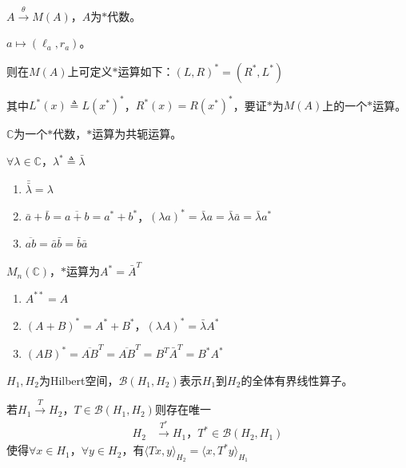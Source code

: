 \documentclass[lang=cn,a4paper,newtx,section]{elegantbook}
\begin{document}
\begin{proposition}
  $A \xrightarrow{\theta} M(A)$，$A$为$*$代数。
  
  $a \longmapsto (\ell_a, r_a)$。
  
  则在$M(A)$上可定义$*$运算如下：$(L, R)^* = (R^*, L^*)$
  
  其中$L^*(x) \triangleq L(x^*)^*$，$R^*(x) = R(x^*)^*$，要证$*$为$M(A)$上的一个$*$运算。
\end{proposition}

\begin{example}
  $\mathbb{C}$为一个$*$代数，$*$运算为共轭运算。
  
  $\forall \lambda \in \mathbb{C}$，$\lambda^* \triangleq \bar{\lambda}$
  
  \begin{enumerate}
    \item $\bar{\bar{\lambda}} = \lambda$
    \item $\bar{a} + \bar{b} = \overline{a + b}=a^*+b^*$，$(\lambda a)^* = \bar{\lambda}a = \bar{\lambda}\bar{a} = \bar{\lambda}a^*$
    \item $\overline{ab} = \bar{a}\bar{b} = \bar{b}\bar{a}$
  \end{enumerate}
\end{example}

\begin{example}
  $M_n(\mathbb{C})$，$*$运算为$A^* = \bar{A}^T$
  
  \begin{enumerate}
    \item $A^{**} = A$
    \item $(A + B)^* = A^* + B^*$，$(\lambda A)^* = \bar{\lambda}A^*$
    \item $(AB)^* = \overline{AB}^T = \overline{AB}^T = B^T\bar{A}^T = B^*A^*$
  \end{enumerate}
\end{example}

\begin{definition}
  $H_1, H_2$为Hilbert空间，$\mathcal{B}(H_1, H_2)$表示$H_1$到$H_2$的全体有界线性算子。
\end{definition}

\begin{proposition}
  若$H_1 \xrightarrow{T} H_2$，$T \in \mathcal{B}(H_1, H_2)$则存在唯一
  \begin{equation*}
    \begin{aligned}
      H_2 &\xrightarrow{T^*} H_1，T^* \in \mathcal{B}(H_2, H_1)
    \end{aligned}
  \end{equation*}
  使得$\forall x \in H_1$，$\forall y \in H_2$，有$\langle Tx, y \rangle_{H_2} = \langle x, T^*y \rangle_{H_1}$
\end{proposition}
\end{document}
